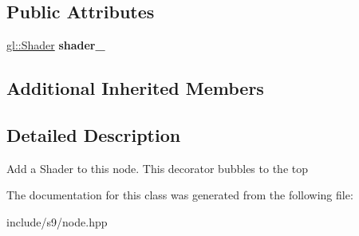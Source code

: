 \subsection*{Public Attributes}
\begin{DoxyCompactItemize}
\item 
\hypertarget{classs9_1_1NodeShader_ac34014283a48a6d5724e87a713bf6ba1}{\hyperlink{classs9_1_1gl_1_1Shader}{gl\-::\-Shader} {\bfseries shader\-\_\-}}\label{classs9_1_1NodeShader_ac34014283a48a6d5724e87a713bf6ba1}

\end{DoxyCompactItemize}
\subsection*{Additional Inherited Members}


\subsection{Detailed Description}
Add a Shader to this node. This decorator bubbles to the top 

The documentation for this class was generated from the following file\-:\begin{DoxyCompactItemize}
\item 
include/s9/node.\-hpp\end{DoxyCompactItemize}
